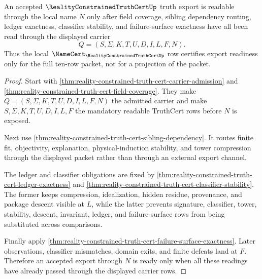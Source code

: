 \begin{theorem}
\label{thm:reality-constrained-truth-cert-export-readiness}
An accepted $\RealityConstrainedTruthCertUp$ truth export is readable through the
local name $N$ only after field coverage, sibling dependency routing, ledger
exactness, classifier stability, and failure-surface exactness have all been read
through the displayed carrier
$$
Q=(S,\Sigma,K,T,U,D,I,L,F,N).
$$
Thus the local $\NameCert_{\RealityConstrainedTruthCertUp}$ row certifies export
readiness only for the full ten-row packet, not for a projection of the packet.
\end{theorem}
\begin{proof}
Start with \autoref{thm:reality-constrained-truth-cert-carrier-admission} and
\autoref{thm:reality-constrained-truth-cert-field-coverage}. They make
$Q=(S,\Sigma,K,T,U,D,I,L,F,N)$ the admitted carrier and make
$S,\Sigma,K,T,U,D,I,L,F$ the mandatory readable TruthCert rows before $N$ is
exposed.

Next use \autoref{thm:reality-constrained-truth-cert-sibling-dependency}. It
routes finite fit, objectivity, explanation, physical-induction stability, and
tower compression through the displayed packet rather than through an external
export channel.

The ledger and classifier obligations are fixed by
\autoref{thm:reality-constrained-truth-cert-ledger-exactness} and
\autoref{thm:reality-constrained-truth-cert-classifier-stability}. The former
keeps compression, idealization, hidden residue, provenance, and package descent
visible at $L$, while the latter prevents signature, classifier, tower,
stability, descent, invariant, ledger, and failure-surface rows from being
substituted across comparisons.

Finally apply
\autoref{thm:reality-constrained-truth-cert-failure-surface-exactness}. Later
observations, classifier mismatches, domain exits, and finite defeats land at
$F$. Therefore an accepted export through $N$ is ready only when all these
readings have already passed through the displayed carrier rows.
\end{proof}

